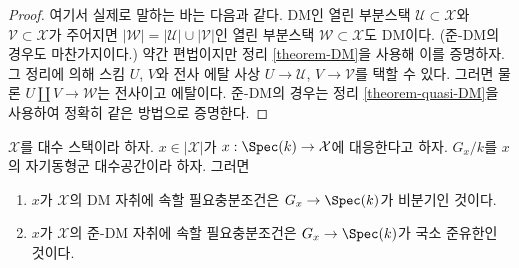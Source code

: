 \begin{proof}
여기서 실제로 말하는 바는 다음과 같다. DM인 열린 부분스택
$\mathcal{U} \subset \mathcal{X}$와 $\mathcal{V} \subset \mathcal{X}$가
주어지면 $|\mathcal{W}| = |\mathcal{U}| \cup |\mathcal{V}|$인 열린
부분스택 $\mathcal{W} \subset \mathcal{X}$도 DM이다. (준-DM의 경우도
마찬가지이다.) 약간 편법이지만 정리 \ref{theorem-DM}을 사용해 이를
증명하자. 그 정리에 의해 스킴 $U$, $V$와 전사 에탈 사상
$U \to \mathcal{U}$, $V \to \mathcal{V}$를 택할 수 있다. 그러면 물론
$U \amalg V \to \mathcal{W}$는 전사이고 에탈이다. 준-DM의 경우는
정리 \ref{theorem-quasi-DM}을 사용하여 정확히 같은 방법으로 증명한다.
\end{proof}

\begin{lemma}
\label{lemma-points-DM-locus}
$\mathcal{X}$를 대수 스택이라 하자. $x \in |\mathcal{X}|$가
$x : \Spec(k) \to \mathcal{X}$에 대응한다고 하자. $G_x/k$를 $x$의
자기동형군 대수공간이라 하자. 그러면
\begin{enumerate}
\item $x$가 $\mathcal{X}$의 DM 자취에 속할 필요충분조건은
$G_x \to \Spec(k)$가 비분기인 것이다.
\item $x$가 $\mathcal{X}$의 준-DM 자취에 속할 필요충분조건은
$G_x \to \Spec(k)$가 국소 준유한인 것이다.
\end{enumerate}
\end{lemma}

